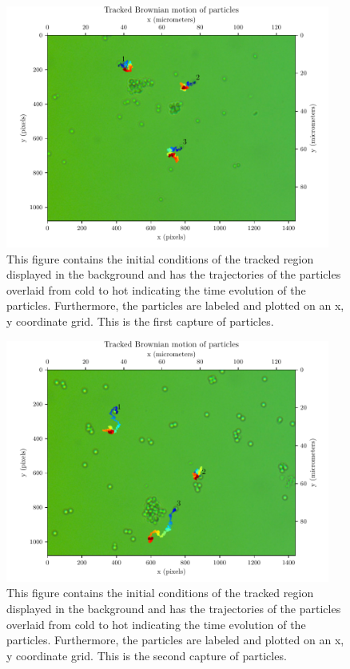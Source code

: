 \documentclass[12pt,english,ngerman]{scrartcl}
\begin{document}
\begin{figure}[H]
	\centering
	\includegraphics[width=0.95\textwidth]{figures/I1_tracked.pdf}
	\caption[Capture 1 of particles]{This figure contains the initial conditions of the
		tracked region displayed in the background and has the trajectories of the
		particles overlaid from cold to hot indicating the time evolution of the
		particles. Furthermore, the particles are labeled and plotted on an x, y
		coordinate grid. This is the first capture of particles.
	}\label{fig:part_overview_1}
\end{figure}

\begin{figure}[H]
	\centering
	\includegraphics[width=0.95\textwidth]{figures/I2_tracked.pdf}
	\caption[Capture 2 of particles]{This figure contains the initial conditions of the
		tracked region displayed in the background and has the trajectories of the
		particles overlaid from cold to hot indicating the time evolution of the
		particles. Furthermore, the particles are labeled and plotted on an x, y
		coordinate grid. This is the second capture of particles.
	}\label{fig:part_overview_2}
\end{figure}
\end{document}
